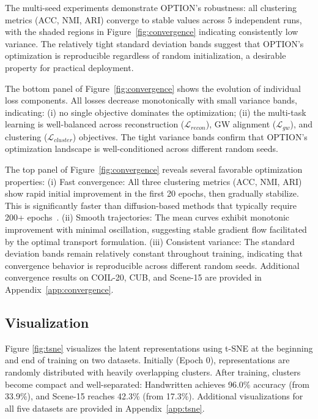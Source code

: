 \documentclass{article}
\theoremstyle{plain}
\theoremstyle{definition}
\theoremstyle{remark}
\begin{document}
The multi-seed experiments demonstrate OPTION's robustness: all clustering metrics (ACC, NMI, ARI) converge to stable values across 5 independent runs, with the shaded regions in Figure~\ref{fig:convergence} indicating consistently low variance. The relatively tight standard deviation bands suggest that OPTION's optimization is reproducible regardless of random initialization, a desirable property for practical deployment.

The bottom panel of Figure~\ref{fig:convergence} shows the evolution of individual loss components. All losses decrease monotonically with small variance bands, indicating: (i) no single objective dominates the optimization; (ii) the multi-task learning is well-balanced across reconstruction ($\mathcal{L}_{recon}$), GW alignment ($\mathcal{L}_{gw}$), and clustering ($\mathcal{L}_{cluster}$) objectives. The tight variance bands confirm that OPTION's optimization landscape is well-conditioned across different random seeds.

The top panel of Figure~\ref{fig:convergence} reveals several favorable optimization properties: (i) Fast convergence: All three clustering metrics (ACC, NMI, ARI) show rapid initial improvement in the first 20 epochs, then gradually stabilize. This is significantly faster than diffusion-based methods that typically require 200+ epochs~\cite{zhangIncompleteMultiviewClustering2025a}. (ii) Smooth trajectories: The mean curves exhibit monotonic improvement with minimal oscillation, suggesting stable gradient flow facilitated by the optimal transport formulation. (iii) Consistent variance: The standard deviation bands remain relatively constant throughout training, indicating that convergence behavior is reproducible across different random seeds. Additional convergence results on COIL-20, CUB, and Scene-15 are provided in Appendix~\ref{app:convergence}.


\subsection{Visualization}
\label{subsec:vis_efficiency}
 Figure \ref{fig:tsne} visualizes the latent representations using t-SNE at the beginning and end of training on two datasets. Initially (Epoch 0), representations are randomly distributed with heavily overlapping clusters. After training, clusters become compact and well-separated: Handwritten achieves 96.0\% accuracy (from 33.9\%), and Scene-15 reaches 42.3\% (from 17.3\%). Additional visualizations for all five datasets are provided in Appendix~\ref{app:tsne}.
\end{document}
